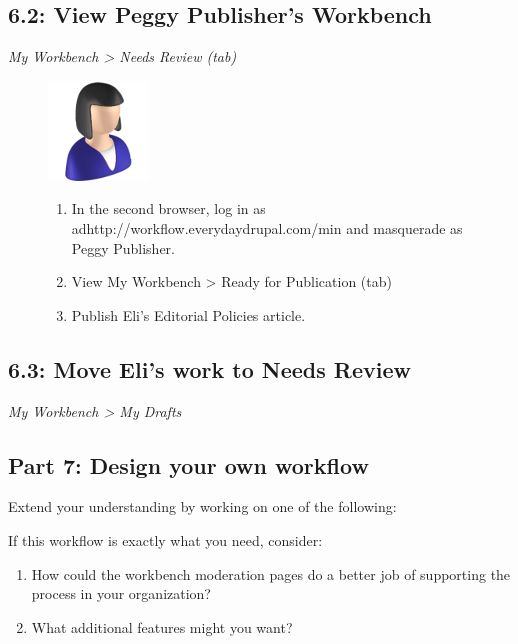 \documentclass[letterpaper,10pt,english]{sphinxmanual}
\begin{document}
\subsection{6.2: View Peggy Publisher's Workbench}
\label{workbench:view-peggy-publisher-s-workbench}
\emph{My Workbench \textgreater{} Needs Review (tab)}
\begin{figure}[htbp]
\centering

\includegraphics{publisher.png}
{\small \begin{enumerate}
\item {} 
In the second browser, log in as adhttp://workflow.everydaydrupal.com/min and masquerade as Peggy Publisher.

\item {} 
View My Workbench \textgreater{} Ready for Publication (tab)

\item {} 
Publish Eli's Editorial Policies article.

\end{enumerate}
}\end{figure}


\subsection{6.3: Move Eli's work to Needs Review}
\label{workbench:move-eli-s-work-to-needs-review}
\emph{My Workbench \textgreater{} My Drafts}


\subsection{Part 7: Design your own workflow}
\label{workbench:part-7-design-your-own-workflow}
Extend your understanding by working on one of the following:

If this workflow is exactly what you need, consider:
\begin{enumerate}
\item {} 
How could the workbench moderation pages do a better job of supporting the process in your organization?

\item {} 
What additional features might you want?

\end{enumerate}
\end{document}
